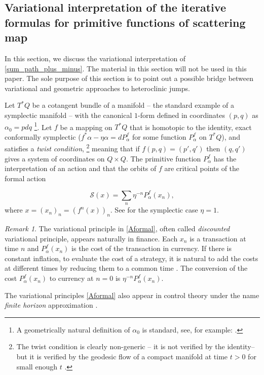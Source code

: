 \documentclass[11pt]{amsart}
\theoremstyle{definition}
\theoremstyle{remark}
\newtheorem{rem}[thm]{Remark}
\numberwithin{equation}{section}
\begin{document}
\subsection{Variational interpretation of the iterative formulas for primitive functions of scattering map}
\label{sec:variational}

In this section, we discuss the variational interpretation of
\eqref{sum_path_plus_minus}.
The material in this section will not be used in this paper.
The sole purpose of this section is to point out a possible bridge between variational and geometric approaches to heteroclinic jumps.

Let $T^*Q$ be a cotangent bundle of a   manifold -- the standard
example of a symplectic manifold  -- with the canonical
$1$-form defined in coordinates $(p,q)$ as $\alpha_0 = pdq$
\footnote{A geometrically natural  definition  of $\alpha_0$ is
standard, see, for example:
\cite[Proposition 3.2,11 p. 180]{AbrahamM78}.}.
Let $f$ be a mapping on $T^*Q$ that is homotopic to the identity,   exact conformally symplectic
($f^*\alpha-\eta\alpha=dP^f_\alpha$ for some function $P^f_\alpha$ on $T^*Q$), and satisfies a \emph{twist condition},
\footnote{
The twist condition  is clearly
non-generic -- it is not
verified by the identity--  but  it is verified by the
geodesic flow of a compact manifold at time $t > 0 $ for small enough $t$
\cite{Gole94}.}
meaning that if $f(p,q)=(p',q')$ then $(q,q')$ gives a system of coordinates on $Q\times Q$.
The primitive function $P^f_\alpha$ has the interpretation
of an action and that the orbits of $f$ are critical points
of the formal action

\def\SS{\mathscr{S}}
\begin{equation}\label{Aformal}
  \SS(x) = \sum_n \eta^{-n} P^f_\alpha(x_n),
\end{equation}
where $x =(x_n)_n=(f^n(x))_n$.
See \cite{Haro00} for the  symplectic case $\eta = 1$.

\begin{rem}
The variational principle in \eqref{Aformal},
often called \emph{discounted} variational principle,
appears naturally in finance. Each $x_n$ is a transaction at time $n$
and $P^f_\alpha(x_n)$ is the cost of the transaction in currency.
If there is constant inflation, to evaluate the cost
of a strategy, it is natural to add the costs at different times
by reducing them to a common time \cite{Bensoussan88}.
The conversion of the cost $P^f_\alpha(x_n)$ to currency
at $n = 0$ is $\eta^{-n} P^f_\alpha(x_n)$.

The variational principles \eqref{Aformal} also appear in control theory under the
name \emph{finite horizon} approximation \cite{KaliseKR17}.
\end{rem}
\end{document}

